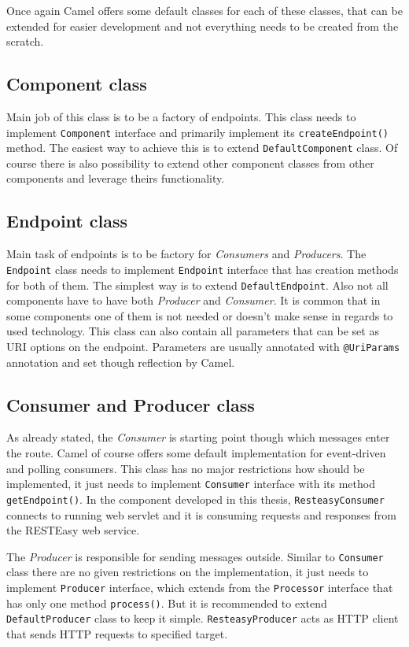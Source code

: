 \documentclass[12pt,final,oneside]{fithesis2}
\begin{document}
Once again Camel offers some default classes for each of these classes, that can be extended for easier development and not everything needs to be created from the scratch.

\subsection*{Component class}
Main job of this class is to be a factory of endpoints. This class needs to implement \texttt{Component} interface and primarily implement its \texttt{createEndpoint()} method. The easiest way to achieve this is to extend \texttt{DefaultComponent} class. Of course there is also possibility to extend other component classes from other components and leverage theirs functionality.

\subsection*{Endpoint class}
Main task of endpoints is to be factory for \textit{Consumers} and \textit{Producers}. The \texttt{Endpoint} class needs to implement \texttt{Endpoint} interface that has creation methods for both of them. The simplest way is to extend \texttt{DefaultEndpoint}. Also not all components have to have both \textit{Producer} and \textit{Consumer}. It is common that in some components one of them is not needed or doesn't make sense in regards to used technology. This class can also contain all parameters that can be set as URI options on the endpoint. Parameters are usually annotated with \texttt{@UriParams} annotation and set though reflection by Camel.

\subsection*{Consumer and Producer class}
As already stated, the \textit{Consumer} is starting point though which messages enter the route. Camel of course offers some default implementation for event-driven and polling consumers. This class has no major restrictions how should be implemented, it just needs to implement \texttt{Consumer} interface with its method \texttt{getEndpoint()}. In the component developed in this thesis, \texttt{ResteasyConsumer} connects to running web servlet and it is consuming requests and responses from the RESTEasy web service. 

The \textit{Producer} is responsible for sending messages outside. Similar to \texttt{Consumer} class there are no given restrictions on the implementation, it just needs to implement \texttt{Producer} interface, which extends from the \texttt{Processor} interface that has only one method \texttt{process()}. But it is recommended to extend \texttt{DefaultProducer} class to keep it simple\cite{camel-cookbook}. \texttt{ResteasyProducer} acts as HTTP client that sends HTTP requests to specified target.
\end{document}
